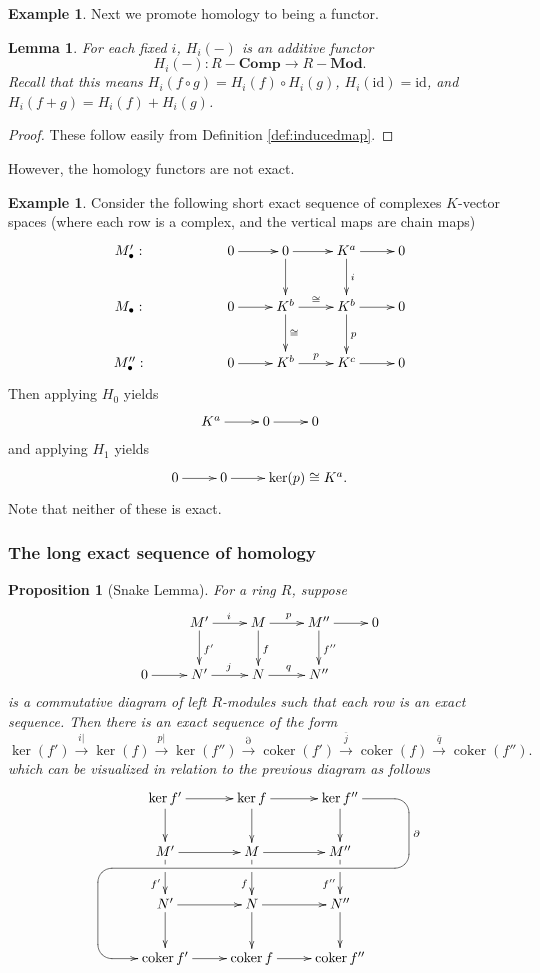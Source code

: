 \documentclass{amsart}[12pt]
\def\ker{\operatorname{ker}}
\def\coker{\operatorname{coker}}
\newcommand{\id}{\mathrm{id}}
\numberwithin{equation}{section}
\theoremstyle{plain} %
\newtheorem{lem}[equation]{Lemma}
\newtheorem{prop}[equation]{Proposition}
\theoremstyle{definition}
\newtheorem{ex}[equation]{Example}
\theoremstyle{remark}
\newcommand{\sssec}[1]{\subsubsection{#1}}
\newcommand{\xra}[1]{\xrightarrow{#1}}
\newcommand{\Mod}[1]{#1-\mathbf{Mod}}
\newcommand{\Cx}[1]{#1-\mathbf{Comp}}
\begin{document}
\begin{ex}
Next we promote homology to being a functor.


\begin{lem} For each fixed $i$, $H_i(-)$ is an additive functor 
\[H_i(-):\Cx{R} \to \Mod{R}.\]
Recall that this means $H_i(f\circ g) = H_i(f) \circ H_i(g)$, $H_i(\id) =
  \id$, and $H_i(f+g) = H_i(f) + H_i(g)$.
    \end{lem}
 \begin{proof}
These follow easily from Definition \ref{def:inducedmap}.
 \end{proof}   
 
 However, the homology functors are not exact.
 
 \begin{ex}
 Consider the following short exact sequence of complexes $K$-vector spaces (where each row is a complex, and the vertical maps are chain maps)
 \[ \xymatrix{M'_\bullet: && 0 \ar[r] & 0 \ar[r]\ar[d] & K^a \ar[r] \ar[d]^-i& 0 \\
M_\bullet: && 0\ar[r] &  K^b \ar[r]^-\cong \ar[d]^-\cong & K^b\ar[r]\ar[d]^p & 0 \\
M''_\bullet: && 0 \ar[r]  & K^b \ar[r]^-p & K^c \ar[r] & 0}\]
Then applying $H_0$ yields
\[ \xymatrix{ K^a \ar[r] & 0 \ar[r] & 0}\]
and applying $H_1$ yields
\[ \xymatrix{ 0 \ar[r] & 0 \ar[r] & \ker(p)\cong K^a.}\]
Note that neither of these is exact.
\end{ex}
 
 
\sssec{The long exact sequence of homology}       



\begin{prop}[Snake Lemma] For a ring $R$, suppose
$$
\xymatrix{
 & M' \ar[r]^i \ar[d]^{f'} & M \ar[r]^p \ar[d]^{f}  & M'' \ar[r] \ar[d]^{f''}  & 0 \\
0 \ar[r] & N' \ar[r]^j            & N \ar[r]^q            & N''          &  \\
}
$$
is a commutative diagram of left $R$-modules such that each row is an exact sequence. 
Then there is an exact sequence of the form
$$
\ker(f') \xra{i|} \ker(f) \xra{p|} \ker(f'') \xra{\partial} \coker(f') \xra{\overline{j}}  \coker(f) \xra{\overline{q}} \coker(f'') .
$$
which can be visualized in relation to the previous diagram as follows
$$\xymatrix{
  & \ker f' \ar[r]\ar[d] & \ker f \ar[r] \ar[d] & \ker f'' \ar[d]\\
  & M' \ar[r] \ar[d]_(.6){f'}|(.3)\hole
      & M \ar[r] \ar[d]_(.6){f}|(.3)\hole
      & M'' \ar[d]_(.6){f''}|(.3)\hole="hole" &  \\
   & N' \ar[r] \ar[d] & N \ar[r]\ar[d] & N'' \ar[d] \\
  & \coker f' \ar[r]
      \ar@{<-} `l [lu]-(.5,0) `"hole" `[rrruu]+(.5,0) `[rruuu]_-\partial [rruuu]
      & \coker f \ar[r] & \coker f''}$$



\end{prop}
\end{ex}
\end{document}
